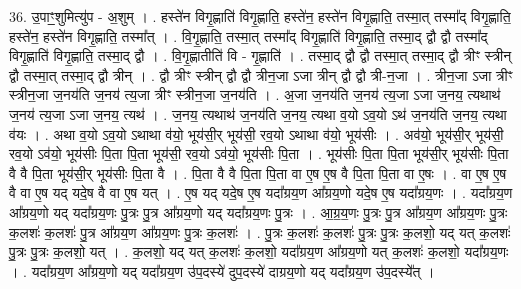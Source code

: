 \documentclass[17pt]{extarticle}
\begin{document}
36. उ॒पाꣳ॒॒शुमित्यु॑प - अ॒शुम् । . हस्ते॑न विगृ॒ह्णाति॑ विगृ॒ह्णाति॒ हस्ते॑न॒ हस्ते॑न विगृ॒ह्णाति॒ तस्मा॒त् तस्मा᳚द् विगृ॒ह्णाति॒ हस्ते॑न॒ हस्ते॑न विगृ॒ह्णाति॒ तस्मा᳚त् । . वि॒गृ॒ह्णाति॒ तस्मा॒त् तस्मा᳚द् विगृ॒ह्णाति॑ विगृ॒ह्णाति॒ तस्मा॒द् द्वौ द्वौ तस्मा᳚द् विगृ॒ह्णाति॑ विगृ॒ह्णाति॒ तस्मा॒द् द्वौ । . वि॒गृ॒ह्णातीति॑ वि - गृ॒ह्णाति॑ । . तस्मा॒द् द्वौ द्वौ तस्मा॒त् तस्मा॒द् द्वौ त्रीꣳ स्त्रीन् द्वौ तस्मा॒त् तस्मा॒द् द्वौ त्रीन् । . द्वौ त्रीꣳ स्त्रीन् द्वौ द्वौ त्रीन॒जा ऽजा त्रीन् द्वौ द्वौ त्री-न॒जा । . त्रीन॒जा ऽजा त्रीꣳ स्त्रीन॒जा ज॒नय॑ति ज॒नय॑ त्य॒जा त्रीꣳ स्त्रीन॒जा ज॒नय॑ति । . अ॒जा ज॒नय॑ति ज॒नय॑ त्य॒जा ऽजा ज॒नय॒ त्यथाथ॑ ज॒नय॑ त्य॒जा ऽजा ज॒नय॒ त्यथ॑ । . ज॒नय॒ त्यथाथ॑ ज॒नय॑ति ज॒नय॒ त्यथा व॒यो ऽव॒यो ऽथ॑ ज॒नय॑ति ज॒नय॒ त्यथा व॑यः । . अथा व॒यो ऽव॒यो ऽथाथा व॑यो॒ भूय॑सी॒र् भूय॑सी॒ रव॒यो ऽथाथा व॑यो॒ भूय॑सीः । . अव॑यो॒ भूय॑सी॒र् भूय॑सी॒ रव॒यो ऽव॑यो॒ भूय॑सीः पि॒ता पि॒ता भूय॑सी॒ रव॒यो ऽव॑यो॒ भूय॑सीः पि॒ता । . भूय॑सीः पि॒ता पि॒ता भूय॑सी॒र् भूय॑सीः पि॒ता वै वै पि॒ता भूय॑सी॒र् भूय॑सीः पि॒ता वै । . पि॒ता वै वै पि॒ता पि॒ता वा ए॒ष ए॒ष वै पि॒ता पि॒ता वा ए॒षः । . वा ए॒ष ए॒ष वै वा ए॒ष यद् यदे॒ष वै वा ए॒ष यत् । . ए॒ष यद् यदे॒ष ए॒ष यदा᳚ग्रय॒ण आ᳚ग्रय॒णो यदे॒ष ए॒ष यदा᳚ग्रय॒णः । . यदा᳚ग्रय॒ण आ᳚ग्रय॒णो यद् यदा᳚ग्रय॒णः पु॒त्रः पु॒त्र आ᳚ग्रय॒णो यद् यदा᳚ग्रय॒णः पु॒त्रः । . आ॒ग्र॒य॒णः पु॒त्रः पु॒त्र आ᳚ग्रय॒ण आ᳚ग्रय॒णः पु॒त्रः क॒लशः॑ क॒लशः॑ पु॒त्र आ᳚ग्रय॒ण आ᳚ग्रय॒णः पु॒त्रः क॒लशः॑ । . पु॒त्रः क॒लशः॑ क॒लशः॑ पु॒त्रः पु॒त्रः क॒लशो॒ यद् यत् क॒लशः॑ पु॒त्रः पु॒त्रः क॒लशो॒ यत् । . क॒लशो॒ यद् यत् क॒लशः॑ क॒लशो॒ यदा᳚ग्रय॒ण आ᳚ग्रय॒णो यत् क॒लशः॑ क॒लशो॒ यदा᳚ग्रय॒णः । . यदा᳚ग्रय॒ण आ᳚ग्रय॒णो यद् यदा᳚ग्रय॒ण उ॑प॒दस्ये॑ दुप॒दस्ये॑ दाग्रय॒णो यद् यदा᳚ग्रय॒ण उ॑प॒दस्ये᳚त् । \newline
\end{document}

